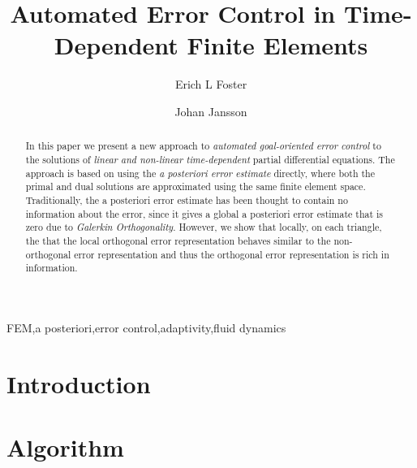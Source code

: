\documentclass[a4paper]{elsarticle}
\begin{document}
  \begin{frontmatter}
    \author[BCAM]{Erich L Foster}

    \author[BCAM,KTH]{Johan Jansson}

    \address[BCAM]{Basque Center for Applied Mathematics, Bilbao, Basque Country -- Spain}

    \address[KTH]{CSC, KTH Royal Institute of Technology, Stockholm, Sweden}

    \title{Automated Error Control in Time-Dependent Finite Elements}

    \begin{abstract}
      In this paper we present a new approach to \emph{automated goal-oriented
      error control} to the solutions of \emph{linear and non-linear
      time-dependent} partial differential equations. The approach is based
      on using the \emph{a posteriori error estimate} directly, where both the
      primal and dual solutions are approximated using the same finite element
      space.  Traditionally, the a posteriori error estimate has been thought to
      contain no information about the error, since it gives a global a
      posteriori error estimate that is zero due to \emph{Galerkin
      Orthogonality}. However, we show that locally, on each triangle, the that
      the local orthogonal error representation behaves similar to the
      non-orthogonal error representation and thus the orthogonal error
      representation is rich in information.
    \end{abstract}
    \begin{keyword}
      FEM\sep a posteriori\sep error control\sep adaptivity\sep fluid dynamics
    \end{keyword}
  \end{frontmatter}

  \section{Introduction} \label{sec:Intro}
  

  \section{Algorithm} \label{sec:Algorithm}
  
\end{document}
